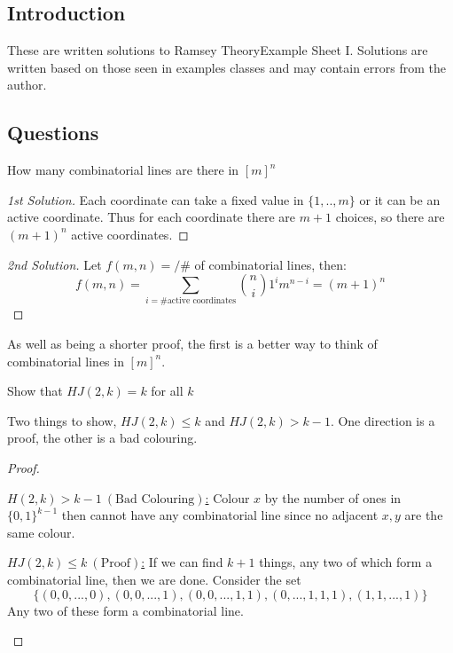 \documentclass[a4paper]{article}
\def\ntitle{Ramsey Theory}
\def\nsheet{I}
\begin{document}
	
	
	\subsection*{Introduction}
	These are written solutions to \ntitle  Example Sheet \nsheet. Solutions are written based on those seen in examples classes and may contain errors from the author.
	\subsection*{Questions}

	\begin{question}[Question 1]
	How many combinatorial lines are there in $[m]^n$
	\end{question}
	
	\begin{proof}[1st Solution]
		Each coordinate can take a fixed value in $\{1,..,m\}$ or it can be an active coordinate. Thus for each coordinate there are $m+1$ choices, so there are $(m+1)^n$ active coordinates.
	\end{proof}
	\begin{proof}[2nd Solution]
	Let $f(m,n) = /  \#$ of combinatorial lines, then:
	\[f(m,n) = \sum_{i = \#  \text{active coordinates}} { {n \choose i}1^{i}m^{n-i}} = (m+1)^n\]
	\end{proof}
	\begin{remark}
		As well as being a shorter proof, the first is a better way to think of combinatorial lines in $[m]^n$.
	\end{remark}
	
	\begin{question}[Question 2]
	Show that $HJ(2,k) = k$ for all $k$
	\end{question}
	\begin{idea}
	Two things to show, $HJ(2,k) \leq k$ and $HJ(2,k) > k-1$. One direction is a proof, the other is a bad colouring.
	\end{idea}
	\begin{proof} $ $\newline
	\begin{description}
	\item \underline{$H(2,k) > k-1 \ (\text{Bad Colouring})$:} Colour $x$ by the number of ones in $\{0,1\}^{k-1}$ then cannot have any combinatorial line since no adjacent $x, y$ are the same colour.
	\item \underline{$HJ(2,k) \leq k \ (\text{Proof})$:} If we can find $k+1$ things, any two of which form a combinatorial line, then we are done. Consider the set
	\[\{(0,0,...,0),(0,0,...,1), (0,0,...,1,1), (0,...,1,1,1), (1,1,...,1)\}\]
Any two of these form a combinatorial line.

	\end{description}
	
	\end{proof}
	
\end{document}
